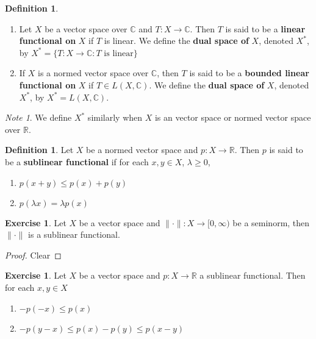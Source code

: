\documentclass[12pt]{amsart}
\theoremstyle{definition}
\newtheorem{defn}[definition]{Definition}
\theoremstyle{remark}
\newtheorem{note}[remark]{Note}
\theoremstyle{definition}
\newtheorem{ex}[definition]{Exercise}
\newcommand{\lam}{\lambda}
\newcommand{\C}{\mathbb{C}}
\newcommand{\R}{\mathbb{R}}
\newcommand{\Rg}{[0,\infty)}
\begin{document}
	\begin{defn}\
		\begin{enumerate}
		\item Let $X$ be a vector space over $\C$ and $T :X \rightarrow \C$. Then $T$ is said to be a \textbf{linear functional on} $X$ if $T$ is linear. We define the \textbf{dual space of} $X$, denoted $X^*$, by $ X^* = \{ T:X \rightarrow \C: T \text{ is linear} \} $
		\item If $X$ is a normed vector space over $\C$, then $T$ is said to be a \textbf{bounded linear functional on} $X$ if $T \in L(X, \C)$. We define the \textbf{dual space of} $X$, denoted $X^*$, by $X^* = L(X, \C)$.
		\end{enumerate}
	\end{defn}
	
	\begin{note}
	We define $X^*$ similarly when $X$ is an vector space or normed vector space over $\R$.
	\end{note}
	
	\begin{defn}
		Let $X$ be a normed vector space and $p:X \rightarrow \R$. Then $p$ is said to be a \textbf{sublinear functional} if for each $x,y \in X$, $\lam \geq 0$, 
		\begin{enumerate}
			\item $p(x+y) \leq p(x) + p(y)$
			\item $p(\lam x ) = \lam p(x)$
		\end{enumerate}  
	\end{defn}
	
	\begin{ex}
		Let $X$ be a vector space and $\|\cdot \|: X \rightarrow \Rg$ be a seminorm, then $\|\cdot \|$ is a sublinear functional.
	\end{ex}
	
	\begin{proof}
	Clear
	\end{proof}
	
	\begin{ex}
	Let $X$ be a vector space and $p:X \rightarrow \R$ a sublinear functional. Then for each $x, y \in X$
	\begin{enumerate}
	\item $-p(-x) \leq p(x)$
	\item $- p(y-x) \leq p(x) - p(y) \leq p(x-y)$
	\end{enumerate}
	\end{ex}
	
\end{document}
